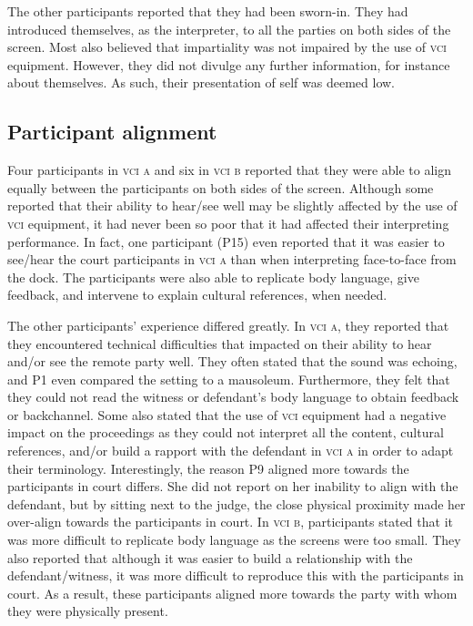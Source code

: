 \documentclass[output=paper]{langsci/langscibook}
\begin{document}
The other participants reported that they had been sworn-in. They had introduced themselves, as the interpreter, to all the parties on both sides of the screen. Most also believed that impartiality was not impaired by the use of \textsc{vci} equipment. However, they did not divulge any further information, for instance about themselves. As such, their presentation of self was deemed low.

\subsection{Participant alignment}
Four participants in \textsc{vci a} and six in \textsc{vci b} reported that they were able to align equally between the participants on both sides of the screen. Although some reported that their ability to hear/see well may be slightly affected by the use of \textsc{vci} equipment, it had never been so poor that it had affected their interpreting performance. In fact, one participant (P15) even reported that it was easier to see/hear the court participants in \textsc{vci a} than when interpreting face-to-face from the dock. The participants were also able to replicate body language, give feedback, and intervene to explain cultural references, when needed. 

The other participants’ experience differed greatly. In \textsc{vci a}, they reported that they encountered technical difficulties that impacted on their ability to hear and/or see the remote party well. They often stated that the sound was echoing, and P1 even compared the setting to a mausoleum. Furthermore, they felt that they could not read the witness or defendant’s body language to obtain feedback or backchannel. Some also stated that the use of \textsc{vci} equipment had a negative impact on the proceedings as they could not interpret all the content, cultural references, and/or build a rapport with the defendant in \textsc{vci a} in order to adapt their terminology. Interestingly, the reason P9 aligned more towards the participants in court differs. She did not report on her inability to align with the defendant, but by sitting next to the judge, the close physical proximity made her over-align towards the participants in court. In \textsc{vci b}, participants stated that it was more difficult to replicate body language as the screens were too small. They also reported that although it was easier to build a relationship with the defendant/witness, it was more difficult to reproduce this with the participants in court. As a result, these participants aligned more towards the party with whom they were physically present. 
\end{document}
